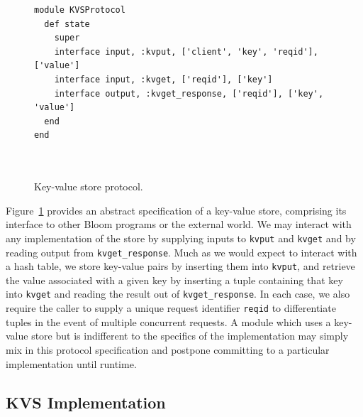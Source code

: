 \begin{figure}[t]
\begin{scriptsize}
\begin{lstlisting}
module KVSProtocol
  def state
    super
    interface input, :kvput, ['client', 'key', 'reqid'], ['value']
    interface input, :kvget, ['reqid'], ['key']
    interface output, :kvget_response, ['reqid'], ['key', 'value']
  end
end



\end{lstlisting}
\centering
\vspace{-10pt}
\caption{Key-value store protocol.}
\label{fig:kvs-proto}
\end{scriptsize}
\vspace{-2pt}
\end{figure}

Figure~\ref{fig:kvs-proto} provides an abstract specification of a key-value store,
comprising its interface to other Bloom programs or the external world.  
We may interact with any implementation of the store
by supplying inputs to \texttt{kvput} and \texttt{kvget} and by reading output from
\texttt{kvget\_response}.  
Much as we would expect to interact
with a hash table, we store key-value pairs by inserting them into \texttt{kvput}, and 
retrieve the value associated with a given key by inserting a tuple containing that key
into \texttt{kvget} and reading the result out of \texttt{kvget\_response}.  In each case,
we also require the caller to supply a unique request identifier \texttt{reqid} to differentiate
tuples in the event of multiple concurrent requests.
A module which uses a key-value store but is indifferent
to the specifics of the implementation may simply mix in this protocol specification
and postpone committing to a particular implementation until runtime.



\subsection{KVS Implementation}



